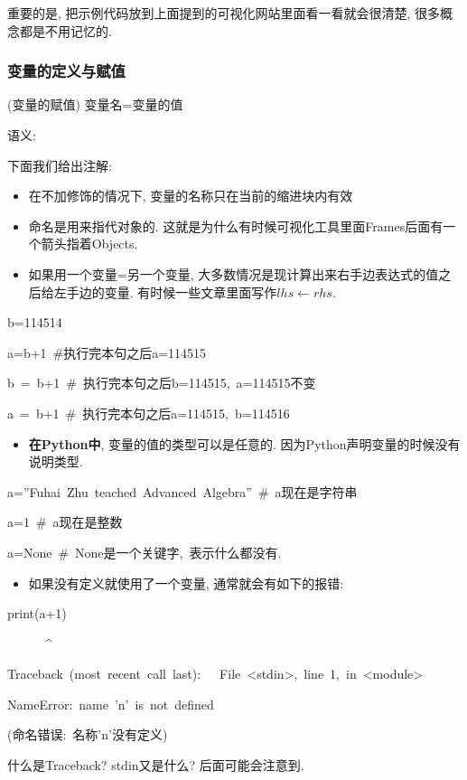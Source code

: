 重要的是, 把示例代码放到上面提到的可视化网站里面看一看就会很清楚, 很多概念都是不用记忆的. 

\subsubsection{变量的定义与赋值}
\begin{definition}
(变量的赋值) 变量名=变量的值
\end{definition}
语义: 

下面我们给出注解:
\begin{itemize}
\item 在不加修饰的情况下, 变量的名称只在当前的缩进块内有效
\item 命名是用来指代对象的. 这就是为什么有时候可视化工具里面Frames后面有一个箭头指着Objects.
\item 如果用一个变量=另一个变量, 大多数情况是现计算出来右手边表达式的值之后给左手边的变量. 有时候一些文章里面写作$lhs\leftarrow rhs$.
\end{itemize}
\begin{lyxcode}
b=114514

a=b+1~\#执行完本句之后a=114515

b~=~b+1~\#~执行完本句之后b=114515,~a=114515不变

a~=~b+1~\#~执行完本句之后a=114515,~b=114516
\end{lyxcode}
\begin{itemize}
\item \textbf{在Python中}, 变量的值的类型可以是任意的. 因为Python声明变量的时候没有说明类型.
\end{itemize}
\begin{lyxcode}
a=''Fuhai~Zhu~teached~Advanced~Algebra''~\#~a现在是字符串

a=1~\#~a现在是整数

a=None~\#~None是一个关键字,~表示什么都没有.
\end{lyxcode}
\begin{itemize}
\item 如果没有定义就使用了一个变量, 通常就会有如下的报错:
\end{itemize}
\begin{lyxcode}
print(a+1)

~~~~~~\textasciicircum{}

Traceback~(most~recent~call~last):~~~File~\textquotedbl <stdin>\textquotedbl ,~line~1,~in~<module>~

NameError:~name~'n'~is~not~defined

(命名错误:~名称'n'没有定义)
\end{lyxcode}
什么是Traceback? stdin又是什么? 后面可能会注意到. 

